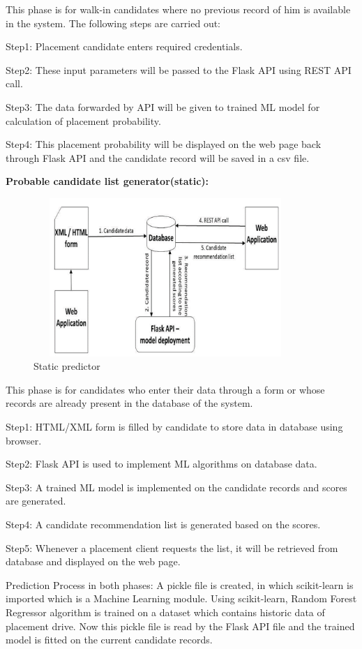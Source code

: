 \documentclass[12pt]{article}
\begin{document}
This phase is for walk-in candidates where no 
previous record of him is available in the system. The following steps are carried out:

Step1: Placement candidate enters required credentials.
 
Step2: These input parameters will be passed to the Flask API using REST API call. 

Step3: The data forwarded by API will be given to trained ML model for calculation of placement probability. 

Step4: This placement probability will be displayed on the web page back through Flask API and the candidate record will be saved in a csv file. 

\textbf{ Probable candidate list generator(static):}

\begin{figure}[H]
\begin{center}
 \includegraphics[width=10cm, height=6cm]{L5P2}
\caption{Static predictor }
\end{center}
\end{figure}

This phase is for candidates who enter their data 
through a form or whose records are already 
present in the database of the system. 

Step1: HTML/XML form is filled by candidate to store data in database using browser. 

Step2: Flask API is used to implement ML algorithms on database data. 

Step3: A trained ML model is implemented on the candidate records and scores are generated. 

Step4: A candidate recommendation list is generated based on the scores. 

Step5: Whenever a placement client requests the list, it will be retrieved from database and displayed on the web page. 

Prediction Process in both phases:
A pickle file is created, in which scikit-learn is 
imported which is a Machine Learning module. 
Using scikit-learn, Random Forest Regressor 
algorithm is trained on a dataset which contains 
historic data of placement drive. 
Now this pickle file is read by the Flask API file 
and the trained model is fitted on the current 
candidate records.
\end{document}
